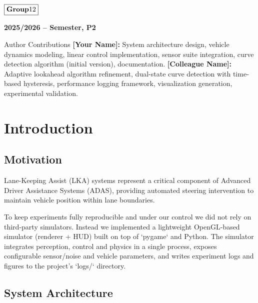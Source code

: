 \documentclass[12pt]{article}
\begin{document}
\begin{flushleft}
    \large $\boxed{\text{\bf Group} 12}$\\[4.0cm]
\end{flushleft}
    
\begin{center}
    \large \bf 2025/2026 --  Semester, P2
\end{center}

\thispagestyle{empty}

\setcounter{page}{0}

\newpage

\tableofcontents 
Author Contributions
\textbf{[Your Name]:} System architecture design, vehicle dynamics modeling, linear control implementation, sensor suite integration, curve detection algorithm (initial version), documentation.
\textbf{[Colleague Name]:} Adaptive lookahead algorithm refinement, dual-state curve detection with time-based hysteresis, performance logging framework, visualization generation, experimental validation.

\newpage
\section{Introduction}

\subsection{Motivation}
Lane-Keeping Assist (LKA) systems represent a critical component of Advanced Driver Assistance Systems (ADAS), providing automated steering intervention to maintain vehicle position within lane boundaries.
\par
To keep experiments fully reproducible and under our control we did not rely on third-party simulators. Instead we implemented a lightweight OpenGL-based simulator (renderer + HUD) built on top of `pygame` and Python. The simulator integrates perception, control and physics in a single process, exposes configurable sensor/noise and vehicle parameters, and writes experiment logs and figures to the project's `logs/` directory.


\subsection{System Architecture}
\end{document}
